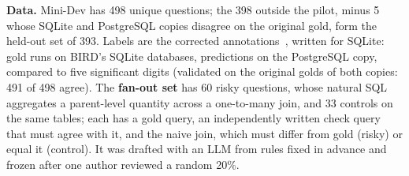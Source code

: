 \documentclass[conference]{IEEEtran}
\begin{document}
\textbf{Data.} Mini-Dev has 498 unique questions; the 398 outside the pilot, minus 5 whose SQLite and
PostgreSQL copies disagree on the original gold, form the held-out set of 393. Labels are the
corrected annotations~\cite{jin2026annotation}, written for SQLite: gold runs on BIRD's SQLite
databases, predictions on the PostgreSQL copy, compared to five significant digits (validated on the
original golds of both copies: 491 of 498 agree). The \textbf{fan-out set} has 60 risky questions,
whose natural SQL aggregates a parent-level quantity across a one-to-many join, and 33 controls on the
same tables; each has a gold query, an independently written check query that must agree with it, and
the naive join, which must differ from gold (risky) or equal it (control). It was drafted with an LLM
from rules fixed in advance and frozen after one author reviewed a random 20\%.
\end{document}
